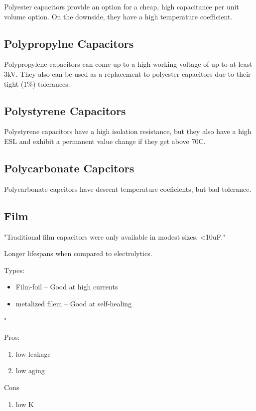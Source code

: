 Polyester capacitors provide an option for a cheap, high capacitance per unit volume option. On the downside, they have a high temperature coefficient. \cite{learn_caps}

\subsection{Polypropylne Capacitors}

Polypropylene capacitors can come up to a high working voltage of up to at least 3kV. They also can be used as a replacement to polyester capacitors due to their tight (1\%) tolerances.\cite{learn_caps}

\subsection{Polystyrene Capacitors}

Polystyrene capacitors have a high isolation resistance, but they also have a high ESL and exhibit a permanent value change if they get above 70C.
\cite{learn_caps}

\subsection{Polycarbonate Capcitors}

Polycarbonate capcitors have descent temperature coeficients, but bad tolerance.  \cite{learn_caps}

\subsection{Film}

"Traditional film capacitors were only available in modest sizes, <10uF."

Longer lifespans when compared to electrolytics.

Types:
\begin{itemize}
    \item Film-foil -- Good at high currents
    \item metalized filem -- Good at self-healing
\end{itemize}

"

Pros:
\begin{enumerate}
    \item low leakage
    \item low aging
\end{enumerate}

Cons
\begin{enumerate}
    \item low K
\end{enumerate}

